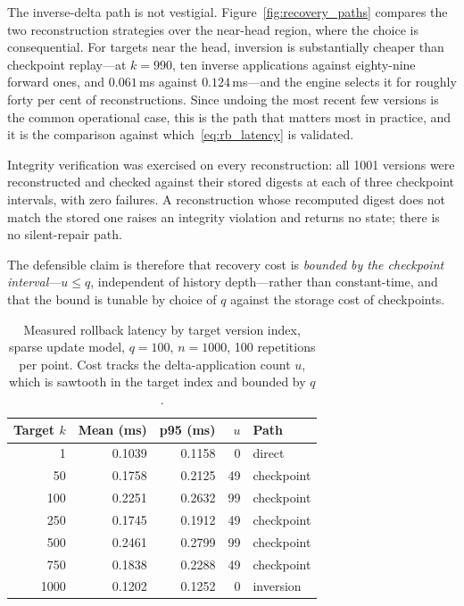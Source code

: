 \documentclass[final,5p,times,twocolumn]{elsarticle}
\begin{document}

The inverse-delta path is not vestigial. Figure~\ref{fig:recovery_paths}
compares the two reconstruction strategies over the near-head region,
where the choice is consequential. For targets near the head,
inversion is substantially cheaper than checkpoint
replay---at $k = 990$, ten inverse applications against eighty-nine
forward ones, and $0.061$\,ms against $0.124$\,ms---and the engine
selects it for roughly forty per cent of reconstructions. Since
undoing the most recent few versions is the common operational case,
this is the path that matters most in practice, and it is the
comparison against which~\eqref{eq:rb_latency} is validated.


Integrity verification was exercised on every reconstruction: all 1001 versions
were reconstructed and checked against their stored digests at each of three
checkpoint intervals, with zero failures. A reconstruction whose recomputed
digest does not match the stored one raises an integrity violation and returns
no state; there is no silent-repair path.

The defensible claim is therefore that recovery cost is \emph{bounded by the
checkpoint interval}---$u \leq q$, independent of history depth---rather than
constant-time, and that the bound is tunable by choice of $q$ against the
storage cost of checkpoints.

\begin{table}[htbp]\centering
\caption{Measured rollback latency by target version index, sparse update model,
$q=100$, $n=1000$, 100 repetitions per point. Cost tracks the delta-application
count $u$, which is sawtooth in the target index and bounded by $q$.}
\label{tab:c3_lifecycle}
\begin{tabular}{rrrrl}\toprule
Target $k$ & Mean (ms) & p95 (ms) & $u$ & Path \\\midrule
1    & 0.1039 & 0.1158 &  0 & direct \\
50   & 0.1758 & 0.2125 & 49 & checkpoint \\
100  & 0.2251 & 0.2632 & 99 & checkpoint \\
250  & 0.1745 & 0.1912 & 49 & checkpoint \\
500  & 0.2461 & 0.2799 & 99 & checkpoint \\
750  & 0.1838 & 0.2288 & 49 & checkpoint \\
1000 & 0.1202 & 0.1252 &  0 & inversion \\
\bottomrule\end{tabular}
\end{table}
\end{document}

